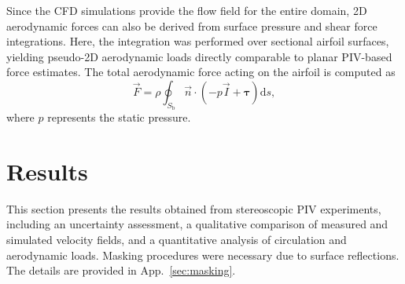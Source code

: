 \documentclass[wes, manuscript]{copernicus}
\begin{document}
Since the CFD simulations provide the flow field for the entire domain, 2D aerodynamic forces can also be derived from surface pressure and shear force integrations. 
Here, the integration was performed over sectional airfoil surfaces, yielding pseudo-2D aerodynamic loads directly comparable to planar PIV-based force estimates.
The total aerodynamic force acting on the airfoil is computed as
\begin{equation}
    \vec{F} = \rho \oint_{S_{\mathrm{b}}} \vec{n} \cdot \left( - p \vec{I} + \boldsymbol{\tau} \right)   \textrm{d}s,
\end{equation}
where $p$ represents the static pressure.
%
\section{Results}\label{sec:results}
%
This section presents the results obtained from stereoscopic PIV experiments, including an uncertainty assessment, a qualitative comparison of measured and simulated velocity fields, and a quantitative analysis of circulation and aerodynamic loads. Masking procedures were necessary due to surface reflections. The details are provided in App.~\ref{sec:masking}.
%
\end{document}

